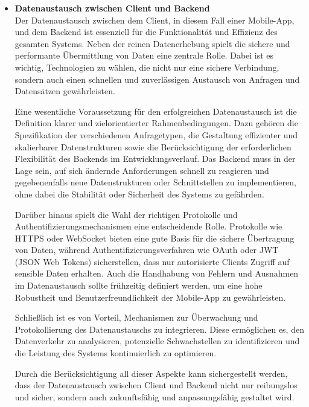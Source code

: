 \documentclass[oneside]{ausarbeitung}
\begin{document}
\begin{itemize}
  \item \textbf{Datenaustausch zwischen Client und Backend}\\ Der Datenaustausch zwischen dem Client, in diesem Fall einer Mobile-App, 
  und dem Backend ist essenziell für die Funktionalität und Effizienz des gesamten Systems. Neben der reinen Datenerhebung spielt die 
  sichere und performante Übermittlung von Daten eine zentrale Rolle. Dabei ist es wichtig, Technologien zu wählen, die nicht nur eine 
  sichere Verbindung, sondern auch einen schnellen und zuverlässigen Austausch von Anfragen und Datensätzen gewährleisten.
  
  Eine wesentliche Voraussetzung für den erfolgreichen Datenaustausch ist die Definition klarer und zielorientierter Rahmenbedingungen. 
  Dazu gehören die Spezifikation der verschiedenen Anfragetypen, die Gestaltung effizienter und skalierbarer Datenstrukturen sowie die 
  Berücksichtigung der erforderlichen Flexibilität des Backends im Entwicklungsverlauf. Das Backend muss in der Lage sein, auf sich 
  ändernde Anforderungen schnell zu reagieren und gegebenenfalls neue Datenstrukturen oder Schnittstellen zu implementieren, ohne dabei 
  die Stabilität oder Sicherheit des Systems zu gefährden.
  
  Darüber hinaus spielt die Wahl der richtigen Protokolle und Authentifizierungsmechanismen eine entscheidende Rolle. Protokolle wie HTTPS 
  oder WebSocket bieten eine gute Basis für die sichere Übertragung von Daten, während Authentifizierungsverfahren wie OAuth oder JWT 
  (JSON Web Tokens) sicherstellen, dass nur autorisierte Clients Zugriff auf sensible Daten erhalten. Auch die Handhabung von Fehlern und 
  Ausnahmen im Datenaustausch sollte frühzeitig definiert werden, um eine hohe Robustheit und Benutzerfreundlichkeit der Mobile-App zu 
  gewährleisten.
  
  Schließlich ist es von Vorteil, Mechanismen zur Überwachung und Protokollierung des Datenaustauschs zu integrieren. Diese ermöglichen 
  es, den Datenverkehr zu analysieren, potenzielle Schwachstellen zu identifizieren und die Leistung des Systems kontinuierlich zu optimieren.
  
  Durch die Berücksichtigung all dieser Aspekte kann sichergestellt werden, dass der Datenaustausch zwischen Client und Backend nicht 
  nur reibungslos und sicher, sondern auch zukunftsfähig und anpassungsfähig gestaltet wird.
  

\end{itemize}
\end{document}
